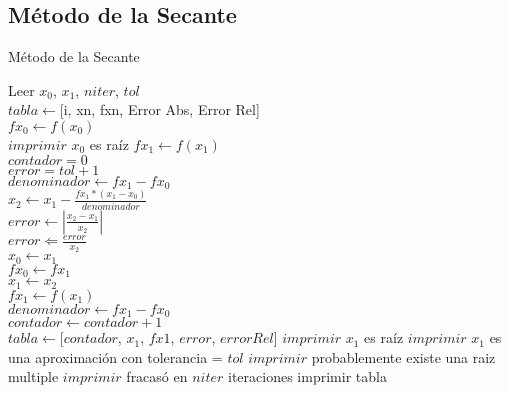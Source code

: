 \documentclass[12pt]{article}
\begin{document}
\subsection{Método de la Secante}
    \begin{algorithm}[H]
        \caption{Método de la Secante}
        \SetAlgoLined
		Leer $x_0$, $x_1$, $niter$, $tol$\\
		$tabla \leftarrow $[i, xn, fxn, Error Abs, Error Rel] \\
        $fx_{0} \leftarrow f(x_{0})$ \\
            {$imprimir$ $x_{0}$ es raíz}
            {
            $fx_{1} \leftarrow f(x_{1})$ \\ 
            $contador = 0$ \\
            $error = tol + 1$ \\
            $denominador \leftarrow fx_{1} - fx_{0}$ \\ 
            {
                $x_{2} \leftarrow x_{1} - \frac{fx_{1} * (x_{1} - x_{0})}{denominador}$ \\
				$error \leftarrow |\frac{x_{2} - x_{1}}{x_{2}}|$ \\
				$error \Leftarrow \frac{error}{x_{2}}$ \\
                $x_{0} \leftarrow x_{1}$ \\
                $fx_{0} \leftarrow fx_{1}$ \\
                $x_{1} \leftarrow x_{2}$ \\ 
                $fx_{1} \leftarrow f(x_{1})$\\
                $denominador \leftarrow fx_{1} - fx_{0}$\\
				$contador \leftarrow contador + 1$\\
				$tabla \leftarrow $[$contador$, $x_{1}$, $fx{1}$, $error$, $error Rel$]
            }
            {$imprimir$ $x_{1}$ es raíz}
            {$imprimir$ $x_{1}$ es una aproximación con tolerancia = $tol$}
            {$imprimir$ probablemente existe una raiz multiple}
            \Else
            {$imprimir$ fracasó en $niter$ iteraciones}
			}
			imprimir tabla
	\end{algorithm}
	
\end{document}
